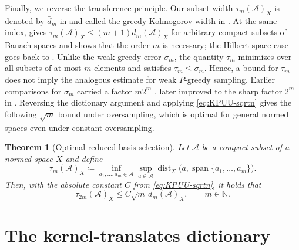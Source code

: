 \documentclass[11pt,reqno, a4paper]{article}
\numberwithin{equation}{section}
\DeclareMathOperator{\dist}{dist}
\newtheorem{theorem}{Theorem}[section]
\newcommand{\N}{\mathbb{N}}
\DeclareMathOperator{\spann}{span}
\begin{document}
Finally, we reverse the transference principle.
Our subset width $\tau_m(\mathcal A)_X$ is denoted by $\bar d_m$ in \cite{Wojtaszczyk15} and called the greedy Kolmogorov width in \cite[Sec.~1.3]{DPSW26}.
At the same index, \cite[Thm.~3.1]{Wojtaszczyk15} gives
$\tau_m(\mathcal A)_X\le(m+1)d_m(\mathcal A)_X$ for arbitrary compact subsets of Banach spaces and shows that the order $m$ is necessary; the Hilbert-space case goes back to \cite[Thm.~4.1]{BCDDPW11}. 
Unlike the weak-greedy error $\sigma_m$, the quantity $\tau_m$ minimizes over all subsets of at most $m$ elements and satisfies $\tau_m\le\sigma_m$.
Hence, a bound for $\tau_m$ does not imply the analogous estimate for weak $P$-greedy sampling.
Earlier comparisons for $\sigma_m$ carried a factor $m2^m$ \cite{BuMaPaPrTu12,DPW13}, later improved to the sharp factor $2^m$ in \cite[(4.4)]{BCDDPW11}.
Reversing the dictionary argument and applying \eqref{eq:KPUU-sqrtn} gives the following $\sqrt m$ bound under oversampling, which is optimal for general normed spaces even under constant oversampling.

\begin{theorem}[Optimal reduced basis selection]\label{cor:best-subset}\label{thm:basis_sel}
Let $\mathcal A$ be a compact subset of a normed space $X$ and define
\begin{equation}\label{eq:tau_m}
    \tau_m(\mathcal A)_X\coloneqq \inf_{a_1,\ldots,a_m\in\mathcal A} \sup_{a\in\mathcal A} \dist_X\bigl(a,\spann\{a_1,\ldots,a_m\}\bigr).
\end{equation}
Then, with the absolute constant $C$ from \eqref{eq:KPUU-sqrtn}, it holds that
\begin{equation}\label{eq:best-subset}
\tau_{2m}(\mathcal A)_X\le C\sqrt m\,d_m(\mathcal A)_X,
\qquad m\in\N.
\end{equation}
\end{theorem}

 
\section{The kernel-translates dictionary}\label{sec:dict}
 
\end{document}
